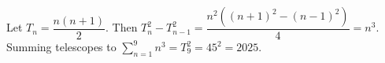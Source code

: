 Let $T_n=\dfrac{n(n+1)}{2}$. Then $T_n^2-T_{n-1}^2=\dfrac{n^2((n+1)^2-(n-1)^2)}{4}=n^3$. Summing telescopes to $\sum_{n=1}^9n^3=T_9^2=45^2=\boxed{2025}$.
